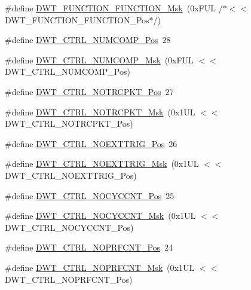 \begin{DoxyCompactItemize}
\item 
\#define \hyperlink{group__CMSIS__DWT_ga3b2cda708755ecf5f921d08b25d774d1}{D\+W\+T\+\_\+\+F\+U\+N\+C\+T\+I\+O\+N\+\_\+\+F\+U\+N\+C\+T\+I\+O\+N\+\_\+\+Msk}~(0x\+F\+U\+L /$\ast$$<$$<$ D\+W\+T\+\_\+\+F\+U\+N\+C\+T\+I\+O\+N\+\_\+\+F\+U\+N\+C\+T\+I\+O\+N\+\_\+\+Pos$\ast$/)
\item 
\#define \hyperlink{group__CMSIS__DWT_gaac44b9b7d5391a7ffef129b7f6c84cd7}{D\+W\+T\+\_\+\+C\+T\+R\+L\+\_\+\+N\+U\+M\+C\+O\+M\+P\+\_\+\+Pos}~28
\item 
\#define \hyperlink{group__CMSIS__DWT_gaa3d37d68c2ba73f2026265584c2815e7}{D\+W\+T\+\_\+\+C\+T\+R\+L\+\_\+\+N\+U\+M\+C\+O\+M\+P\+\_\+\+Msk}~(0x\+F\+U\+L $<$$<$ D\+W\+T\+\_\+\+C\+T\+R\+L\+\_\+\+N\+U\+M\+C\+O\+M\+P\+\_\+\+Pos)
\item 
\#define \hyperlink{group__CMSIS__DWT_gaa82840323a2628e7f4a2b09b74fa73fd}{D\+W\+T\+\_\+\+C\+T\+R\+L\+\_\+\+N\+O\+T\+R\+C\+P\+K\+T\+\_\+\+Pos}~27
\item 
\#define \hyperlink{group__CMSIS__DWT_ga04d8bb0a065ca38e2e5f13a97e1f7073}{D\+W\+T\+\_\+\+C\+T\+R\+L\+\_\+\+N\+O\+T\+R\+C\+P\+K\+T\+\_\+\+Msk}~(0x1\+U\+L $<$$<$ D\+W\+T\+\_\+\+C\+T\+R\+L\+\_\+\+N\+O\+T\+R\+C\+P\+K\+T\+\_\+\+Pos)
\item 
\#define \hyperlink{group__CMSIS__DWT_gad997b9026715d5609b5a3b144eca42d0}{D\+W\+T\+\_\+\+C\+T\+R\+L\+\_\+\+N\+O\+E\+X\+T\+T\+R\+I\+G\+\_\+\+Pos}~26
\item 
\#define \hyperlink{group__CMSIS__DWT_gacc7d15edf7a27147c422099ab475953e}{D\+W\+T\+\_\+\+C\+T\+R\+L\+\_\+\+N\+O\+E\+X\+T\+T\+R\+I\+G\+\_\+\+Msk}~(0x1\+U\+L $<$$<$ D\+W\+T\+\_\+\+C\+T\+R\+L\+\_\+\+N\+O\+E\+X\+T\+T\+R\+I\+G\+\_\+\+Pos)
\item 
\#define \hyperlink{group__CMSIS__DWT_ga337f6167d960f57f12aa382ffecce522}{D\+W\+T\+\_\+\+C\+T\+R\+L\+\_\+\+N\+O\+C\+Y\+C\+C\+N\+T\+\_\+\+Pos}~25
\item 
\#define \hyperlink{group__CMSIS__DWT_gaf40c8d7a4fd978034c137e90f714c143}{D\+W\+T\+\_\+\+C\+T\+R\+L\+\_\+\+N\+O\+C\+Y\+C\+C\+N\+T\+\_\+\+Msk}~(0x1\+U\+L $<$$<$ D\+W\+T\+\_\+\+C\+T\+R\+L\+\_\+\+N\+O\+C\+Y\+C\+C\+N\+T\+\_\+\+Pos)
\item 
\#define \hyperlink{group__CMSIS__DWT_gad52a0e5be84363ab166cc17beca0d048}{D\+W\+T\+\_\+\+C\+T\+R\+L\+\_\+\+N\+O\+P\+R\+F\+C\+N\+T\+\_\+\+Pos}~24
\item 
\#define \hyperlink{group__CMSIS__DWT_gafd8448d7db4bc51f27f202e6e1f27823}{D\+W\+T\+\_\+\+C\+T\+R\+L\+\_\+\+N\+O\+P\+R\+F\+C\+N\+T\+\_\+\+Msk}~(0x1\+U\+L $<$$<$ D\+W\+T\+\_\+\+C\+T\+R\+L\+\_\+\+N\+O\+P\+R\+F\+C\+N\+T\+\_\+\+Pos)
$$
\end{DoxyCompactItemize}
